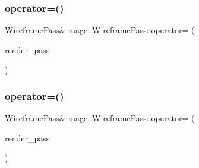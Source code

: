 \hypertarget{classmage_1_1_wireframe_pass_a57da0b468c68c8653ebc639923b111ba}{}\label{classmage_1_1_wireframe_pass_a57da0b468c68c8653ebc639923b111ba} 
\subsubsection{\texorpdfstring{operator=()}{operator=()}\hspace{0.1cm}{\footnotesize\ttfamily [1/2]}}
{\footnotesize\ttfamily \hyperlink{classmage_1_1_wireframe_pass}{Wireframe\+Pass}\& mage\+::\+Wireframe\+Pass\+::operator= (\begin{DoxyParamCaption}\item[{const \hyperlink{classmage_1_1_wireframe_pass}{Wireframe\+Pass} \&}]{render\+\_\+pass }\end{DoxyParamCaption})\hspace{0.3cm}{\ttfamily [delete]}}

\hypertarget{classmage_1_1_wireframe_pass_abd90640d63b9ce0c44b87de87d06910c}{}\label{classmage_1_1_wireframe_pass_abd90640d63b9ce0c44b87de87d06910c} 
\subsubsection{\texorpdfstring{operator=()}{operator=()}\hspace{0.1cm}{\footnotesize\ttfamily [2/2]}}
{\footnotesize\ttfamily \hyperlink{classmage_1_1_wireframe_pass}{Wireframe\+Pass}\& mage\+::\+Wireframe\+Pass\+::operator= (\begin{DoxyParamCaption}\item[{\hyperlink{classmage_1_1_wireframe_pass}{Wireframe\+Pass} \&\&}]{render\+\_\+pass }\end{DoxyParamCaption})\hspace{0.3cm}{\ttfamily [delete]}}

\hypertarget{classmage_1_1_wireframe_pass_ad32bdc71fa20d4084a01660ae4bc8a7f}{}\label{classmage_1_1_wireframe_pass_ad32bdc71fa20d4084a01660ae4bc8a7f} 
